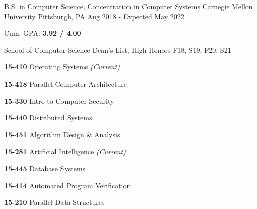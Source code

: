 
\begin{cventries}

  \cventry
    {B.S. in Computer Science, Concentration in Computer Systems} %
    {Carnegie Mellon University} %
    {Pittsburgh, PA} %
    {Aug 2018 - Expected May 2022} %
    {
      \begin{cvitems} %
      \item {Cum. GPA: \textbf{3.92 / 4.00}}
        \item {School of Computer Science Dean's List, High Honors F18, S19, F20, S21}
        \item {}
            \setlength\multicolsep{0pt}
            \begin{multicols}{3}
              \item[] {\textbf{15-410} Operating Systems \textit{\color{awesome}(Current)}}
              \item[] {\textbf{15-418} Parallel Computer Architecture}
              \item[] {\textbf{15-330} Intro to Computer Security}
              \item[] {\textbf{15-440} Distributed Systems}
              \item[] {\textbf{15-451} Algorithm Design \& Analysis}
              \item[] {\textbf{15-281} Artificial Intelligence \textit{\color{awesome}(Current)}}
              \item[] {\textbf{15-445} Database Systems}
              \item[] {\textbf{15-414} Automated Program Verification}
              \item[] {\textbf{15-210} Parallel Data Structures}
            \end{multicols}
      \end{cvitems}
    }

\end{cventries}
